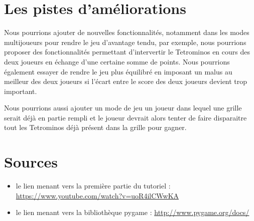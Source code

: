 \documentclass[a4paper, 11pt]{article}
\begin{document}
       \section{Les pistes d'améliorations}
        	Nous pourrions ajouter de nouvelles fonctionnalités, notamment dans les modes multijoueurs pour rendre le jeu d'avantage tendu, par exemple, nous pourrions proposer des fonctionnalités permettant d'intervertir le Tetrominos en cours des deux joueurs en échange d'une certaine somme de points. Nous pourrions également essayer de rendre le jeu plus équilibré en imposant un malus au meilleur des deux joueurs si l'écart entre le score des deux joueurs devient trop important.
        	\newline
        	
        	Nous pourrions aussi ajouter un mode de jeu un joueur dans lequel une grille serait déjà en partie rempli et le joueur devrait alors tenter de faire disparaitre tout les Tetrominos déjà présent dans la grille pour gagner.
    
    \newpage
    \section{Sources}
    	\begin{itemize}
    		\item le lien menant vers la première partie du tutoriel : \url{https://www.youtube.com/watch?v=uoR4ilCWwKA}
    		\item le lien menant vers la bibliothèque pygame : \url{http://www.pygame.org/docs/}
    	\end{itemize}
\end{document}
